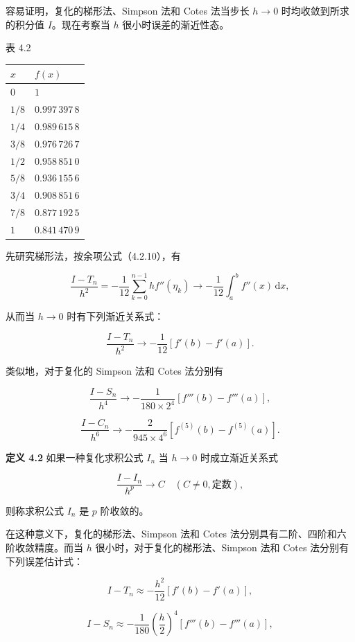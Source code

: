 \documentclass[
  10pt,
  fontset=fandol]{ctexart}
\newcounter{none} %
\begin{document}
容易证明，复化的梯形法、Simpson 法和 Cotes 法当步长 \(h\to0\) 时均收敛到所求的积分值 \(I\)。现在考察当 \(h\) 很小时误差的渐近性态。

表 4.2

{\def\LTcaptype{none} %
\begin{longtable}[]{@{}ll@{}}
\toprule\noalign{}
\(x\) & \(f(x)\) \\
\midrule\noalign{}
\endhead
\bottomrule\noalign{}
\endlastfoot
\(0\) & \(1\) \\
\(1/8\) & \(0.997\,397\,8\) \\
\(1/4\) & \(0.989\,615\,8\) \\
\(3/8\) & \(0.976\,726\,7\) \\
\(1/2\) & \(0.958\,851\,0\) \\
\(5/8\) & \(0.936\,155\,6\) \\
\(3/4\) & \(0.908\,851\,6\) \\
\(7/8\) & \(0.877\,192\,5\) \\
\(1\) & \(0.841\,470\,9\) \\
\end{longtable}
}

先研究梯形法，按余项公式（4.2.10），有

\[
\frac{I-T_n}{h^2}=-\frac1{12}\sum_{k=0}^{n-1}hf''(\eta_k)\to-\frac1{12}\int_a^b f''(x)\,\mathrm{d}x,
\]

从而当 \(h\to0\) 时有下列渐近关系式：

\[
\frac{I-T_n}{h^2}\to-\frac1{12}[f'(b)-f'(a)].
\]

类似地，对于复化的 Simpson 法和 Cotes 法分别有

\[
\frac{I-S_n}{h^4}\to-\frac1{180\times2^4}[f'''(b)-f'''(a)],
\]

\[
\frac{I-C_n}{h^6}\to-\frac2{945\times4^6}[f^{(5)}(b)-f^{(5)}(a)].
\]

\textbf{定义 4.2} 如果一种复化求积公式 \(I_n\) 当 \(h\to0\) 时成立渐近关系式

\[
\frac{I-I_n}{h^p}\to C\quad(C\ne0,\text{定数}),
\]

则称求积公式 \(I_n\) 是 \(p\) 阶收敛的。

在这种意义下，复化的梯形法、Simpson 法和 Cotes 法分别具有二阶、四阶和六阶收敛精度。而当 \(h\) 很小时，对于复化的梯形法、Simpson 法和 Cotes 法分别有下列误差估计式：

\[
I-T_n\approx-\frac{h^2}{12}[f'(b)-f'(a)],
\tag{4.2.15}
\]

\[
I-S_n\approx-\frac1{180}\left(\frac h2\right)^4[f'''(b)-f'''(a)],
\tag{4.2.16}
\]
\end{document}
